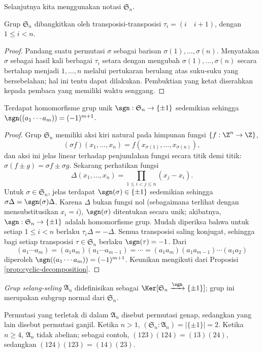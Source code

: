 Selanjutnya kita menggunakan notasi $\mathfrak{S}_n$.
\begin{lemma}\label{prop:S_n-generation}
	Grup $\mathfrak{S}_n$ dibangkitkan oleh transposisi-transposisi $\tau_i = (i \quad i+1)$, dengan $1 \leq i < n$.
\end{lemma}
\begin{proof}
	Pandang suatu permutasi $\sigma$ sebagai barisan $\sigma(1), \ldots, \sigma(n)$. Menyatakan $\sigma$ sebagai hasil kali berbagai $\tau_i$ setara dengan mengubah $\sigma(1), \ldots, \sigma(n)$ secara bertahap menjadi $1, \ldots, n$ melalui pertukaran berulang atas suku-suku yang bersebelahan; hal ini tentu dapat dilakukan. Pembuktian yang ketat diserahkan kepada pembaca yang memiliki waktu senggang.
\end{proof}

\begin{lemma}
	Terdapat homomorfisme grup unik $\sgn: \mathfrak{S}_n \to \{\pm 1\}$ sedemikian sehingga $\sgn((a_1 \cdots a_m)) = (-1)^{m+1}$.
\end{lemma}
\begin{proof}
	Grup $\mathfrak{S}_n$ memiliki aksi kiri natural pada himpunan fungsi $\{ f: \Z^n \to \Z\}$,
	\[ (\sigma f)(x_1, \ldots, x_n) = f(x_{\sigma(1)}, \ldots, x_{\sigma(n)}), \]
	dan aksi ini jelas linear terhadap penjumlahan fungsi secara titik demi titik: $\sigma(f \pm g) = \sigma f \pm \sigma g$. Sekarang perhatikan fungsi
	\[ \Delta(x_1, \ldots, x_n) = \prod_{1 \leq i < j \leq n} (x_j - x_i). \]
	Untuk $\sigma \in \mathfrak{S}_n$, jelas terdapat $\sgn(\sigma) \in \{\pm 1\}$ sedemikian sehingga $\sigma \Delta = \sgn(\sigma)\Delta$. Karena $\Delta$ bukan fungsi nol (sebagaimana terlihat dengan mensubstitusikan $x_i = i$), $\sgn(\sigma)$ ditentukan secara unik; akibatnya, $\sgn: \mathfrak{S}_n \to \{\pm1 \}$ adalah homomorfisme grup. Mudah diperiksa bahwa untuk setiap $1 \leq i < n$ berlaku $\tau_i \Delta = -\Delta$. Semua transposisi saling konjugat, sehingga bagi setiap transposisi $\tau \in \mathfrak{S}_n$ berlaku $\sgn(\tau)=-1$. Dari
	\[(a_1 \cdots a_m) = (a_1 a_m) (a_1 \cdots a_{m-1}) = \cdots = (a_1 a_m) (a_1 a_{m-1}) \cdots (a_1 a_2) \]
	diperoleh $\sgn((a_1 \cdots a_m)) = (-1)^{m+1}$. Keunikan mengikuti dari Proposisi \ref{prop:cyclic-decomposition}.
\end{proof}

\begin{definition}
	\emph{Grup selang-seling} $\mathfrak{A}_n$ didefinisikan sebagai $\Ker[ \mathfrak{S}_n \xrightarrow{\sgn} \{\pm 1\}]$; grup ini merupakan subgrup normal dari $\mathfrak{S}_n$.
\end{definition}
Permutasi yang terletak di dalam $\mathfrak{A}_n$ disebut permutasi genap, sedangkan yang lain disebut permutasi ganjil. Ketika $n > 1$, $(\mathfrak{S}_n : \mathfrak{A}_n) = |\{\pm 1\}| = 2$. Ketika $n \geq 4$, $\mathfrak{A}_n$ tidak abelian; sebagai contoh, $(1 2 3)(1 2 4) = (1 3) (2 4)$, sedangkan $(1 2 4)(1 2 3) = (1 4) (2 3)$.

